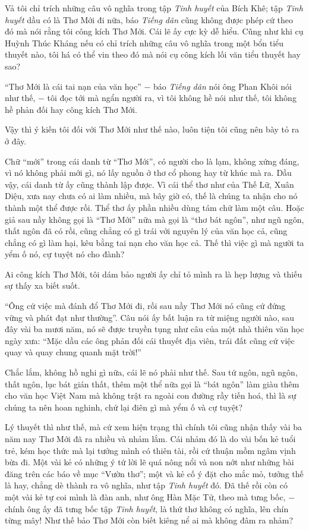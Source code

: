 \documentclass[../main.tex]{subfiles}
\begin{document}
\begin{multicols}{2}
Vả tôi chỉ trích những câu vô nghĩa trong tập \textit{Tinh huyết} của Bích Khê; tập \textit{Tinh huyết } dầu có là Thơ Mới đi nữa, báo \textit{Tiếng dân} cũng không được phép cứ theo đó mà nói rằng tôi công kích Thơ Mới. Cái lẽ ấy cực kỳ dễ hiểu. Cũng như khi cụ Huỳnh Thúc Kháng nếu có chỉ trích những câu vô nghĩa trong một bổn tiểu thuyết nào, tôi há có thể vin theo đó mà nói cụ công kích lối văn tiểu thuyết hay sao? 
 
“Thơ Mới là cái tai nạn của văn học” − báo \textit{Tiếng dân} nói ông Phan Khôi nói như thế, − tôi đọc tới mà ngẩn người ra, vì tôi không hề nói như thế, tôi không hề phản đối hay công kích Thơ Mới. 
 
Vậy thì ý kiến tôi đối với Thơ Mới như thế nào, luôn tiện tôi cũng nên bày tỏ ra ở đây. 
 
Chữ “mới” trong cái danh từ “Thơ Mới”, có người cho là lạm, không xứng đáng, vì nó không phải mới gì, nó lấy nguồn ở thơ cổ phong hay từ khúc mà ra. Dầu vậy, cái danh từ ấy cũng thành lập được. Vì cái thể thơ như của Thế Lữ, Xuân Diệu, xưa nay chưa có ai làm nhiều, mà bây giờ có, thế là chúng ta nhận cho nó thành một thể được rồi. Thể thơ ấy phần nhiều dùng tám chữ làm một câu. Hoặc giả sau nầy không gọi là “Thơ Mới” nữa mà gọi là “thơ bát ngôn”, như ngũ ngôn, thất ngôn đã có rồi, cũng chẳng có gì trái với nguyên lý của văn học cả, cũng chẳng có gì làm hại, kêu bằng tai nạn cho văn học cả. Thế thì việc gì mà người ta yểm ố nó, cự tuyệt nó cho đành? 
 
Ai công kích Thơ Mới, tôi dám bảo người ấy chỉ tỏ mình ra là hẹp lượng và thiếu sự thấy xa biết suốt. 
 
“Ông cứ việc mà đánh đổ Thơ Mới đi, rồi sau nầy Thơ Mới nó cũng cứ đứng vững và phát đạt như thường”. Câu nói ấy bất luận ra từ miệng người nào, sau đây vài ba mươi năm, nó sẽ được truyền tụng như câu của một nhà thiên văn học ngày xưa: “Mặc dầu các ông phản đối cái thuyết địa viên, trái đất cũng cứ việc quay và quay chung quanh mặt trời!” 
 
Chắc lắm, không hồ nghi gì nữa, cái lẽ nó phải như thế. Sau tứ ngôn, ngũ ngôn, thất ngôn, lục bát gián thất, thêm một thể nữa gọi là “bát ngôn” làm giàu thêm cho văn học Việt Nam mà không trật ra ngoài con đường rầy tiến hoá, thì là sự chúng ta nên hoan nghinh, chứ lại điên gì mà yểm ố và cự tuyệt? 
 
Lý thuyết thì như thế, mà cứ xem hiện trạng thì chính tôi cũng nhận thấy vài ba năm nay Thơ Mới đã ra nhiều và nhảm lắm. Cái nhảm đó là do vài bốn kẻ tuổi trẻ, kém học thức mà lại tưởng mình có thiên tài, rồi cứ thuận mồm ngâm vịnh bừa đi. Một vài kẻ có những ý tứ lời lẽ quá nông nổi và non nớt như những bài đăng trên các báo về mục “Vườn thơ”; một và kẻ cố ý đặt cho mắc mỏ, tưởng thế là hay, chẳng dè thành ra vô nghĩa, như tập \textit{Tinh huyết} đó. Đã thế rồi còn có một vài kẻ tự coi mình là đàn anh, như ông Hàn Mặc Tử, theo mà tưng bốc, − chính ông ấy đã tưng bốc tập \textit{Tinh huyết}, là thứ thơ không có nghĩa, lên chín từng mây! Như thế bảo Thơ Mới còn biết kiêng nể ai mà không đâm ra nhảm? 
 

\end{multicols}
\end{document}
